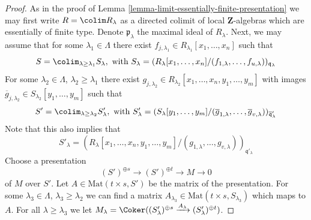 \begin{proof}
As in the proof of Lemma \ref{lemma-limit-essentially-finite-presentation}
we may first write $R = \colim R_\lambda$ as a directed colimit
of local $\mathbf{Z}$-algebras which are essentially of finite type.
Denote $\mathfrak p_\lambda$ the maximal ideal of $R_\lambda$.
Next, we may assume that for some $\lambda_1 \in \Lambda$ there
exist $f_{j, \lambda_1} \in R_{\lambda_1}[x_1, \ldots, x_n]$
such that
$$
S =
\colim_{\lambda \geq \lambda_1} S_\lambda, \text{ with }
S_\lambda =
(R_\lambda[x_1, \ldots, x_n]/
(f_{1, \lambda}, \ldots, f_{u, \lambda}))_{\mathfrak q_\lambda}
$$
For some $\lambda_2 \in \Lambda$,
$\lambda_2 \geq \lambda_1$ there exist
$g_{j, \lambda_2} \in R_{\lambda_2}[x_1, \ldots, x_n, y_1, \ldots, y_m]$
with images
$\overline{g}_{j, \lambda_2} \in S_{\lambda_2}[y_1, \ldots, y_m]$
such that
$$
S' =
\colim_{\lambda \geq \lambda_2} S'_\lambda, \text{ with }
S'_\lambda =
(S_\lambda[y_1, \ldots, y_m]/
(\overline{g}_{1, \lambda}, \ldots,
\overline{g}_{v, \lambda}))_{\overline{\mathfrak q}'_\lambda}
$$
Note that this also implies that
$$
S'_\lambda =
(R_\lambda[x_1, \ldots, x_n, y_1, \ldots, y_m]/
(g_{1, \lambda}, \ldots, g_{v, \lambda}))_{\mathfrak q'_\lambda}
$$
Choose a presentation
$$
(S')^{\oplus s} \to (S')^{\oplus t} \to M \to 0
$$
of $M$ over $S'$. Let $A \in \text{Mat}(t \times s, S')$ be
the matrix of the presentation. For some $\lambda_3 \in \Lambda$,
$\lambda_3 \geq \lambda_2$
we can find a matrix $A_{\lambda_3} \in \text{Mat}(t \times s, S_{\lambda_3})$
which maps to $A$. For all $\lambda \geq \lambda_3$ we let
$M_\lambda = \Coker((S'_\lambda)^{\oplus s} \xrightarrow{A_\lambda}
(S'_\lambda)^{\oplus t})$.


\end{proof}
